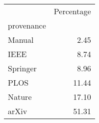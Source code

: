 \begin{tabular}{lr}
\toprule
{} &  Percentage \\
provenance &             \\
\midrule
Manual     &        2.45 \\
IEEE       &        8.74 \\
Springer   &        8.96 \\
PLOS       &       11.44 \\
Nature     &       17.10 \\
arXiv      &       51.31 \\
\bottomrule
\end{tabular}
